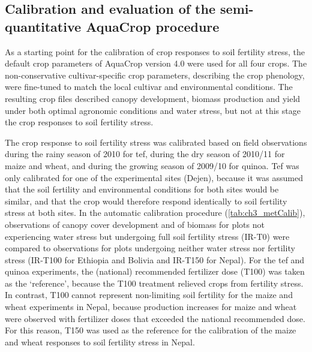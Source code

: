 \subsection{Calibration and evaluation of the semi-quantitative AquaCrop procedure}
As a starting point for the calibration of crop responses to soil fertility stress, the default crop parameters of AquaCrop version 4.0 \parencite{raes2012} were used for all four crops. The non-conservative cultivar-specific crop parameters, describing the crop phenology, were fine-tuned to match the local cultivar and environmental conditions. The resulting crop files described canopy development, biomass production and yield under both optimal agronomic conditions and water stress, but not at this stage the crop responses to soil fertility stress.

The crop response to soil fertility stress was calibrated based on field observations during the rainy season of 2010 for tef, during the dry season of 2010/11 for maize and wheat, and during the growing season of 2009/10 for quinoa. Tef was only calibrated for one of the experimental sites (Dejen), because it was assumed that the soil fertility and environmental conditions for both sites would be similar, and that the crop would therefore respond identically to soil fertility stress at both sites. In the automatic calibration procedure (\autoref{tab:ch3_metCalib}), observations of canopy cover development and of biomass for plots not experiencing water stress but undergoing full soil fertility stress (IR-T0) were compared to observations for plots undergoing neither water stress nor fertility stress (IR-T100 for Ethiopia and Bolivia and IR-T150 for Nepal). For the tef and quinoa experiments, the (national) recommended fertilizer dose (T100) was taken as the `reference', because the T100 treatment relieved crops from fertility stress. In contrast, T100 cannot represent non-limiting soil fertility for the maize and wheat experiments in Nepal, because production increases for maize and wheat were observed with fertilizer doses that exceeded the national recommended dose. For this reason, T150 was used as the reference for the calibration of the maize and wheat responses to soil fertility stress in Nepal. 


